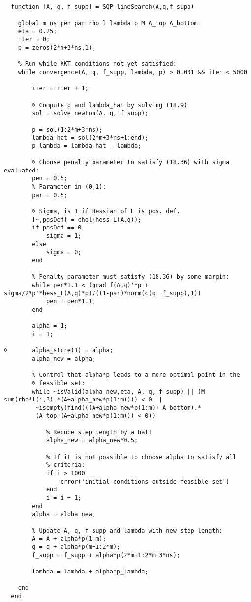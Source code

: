 \begin{lstlisting}

  function [A, q, f_supp] = SQP_lineSearch(A,q,f_supp)
  
    global m ns pen par rho l lambda p M A_top A_bottom
    eta = 0.25;
    iter = 0;
    p = zeros(2*m+3*ns,1);

    % Run while KKT-conditions not yet satisfied:
    while convergence(A, q, f_supp, lambda, p) > 0.001 && iter < 5000 
        
        iter = iter + 1;
        
        % Compute p and lambda_hat by solving (18.9)
        sol = solve_newton(A, q, f_supp);
        
        p = sol(1:2*m+3*ns);
        lambda_hat = sol(2*m+3*ns+1:end);
        p_lambda = lambda_hat - lambda;
        
        % Choose penalty parameter to satisfy (18.36) with sigma evaluated:
        pen = 0.5;
        % Parameter in (0,1):
        par = 0.5;

        % Sigma, is 1 if Hessian of L is pos. def.
        [~,posDef] = chol(hess_L(A,q));
        if posDef == 0
            sigma = 1;
        else
            sigma = 0;
        end

        % Penalty parameter must satisfy (18.36) by some margin:
        while pen*1.1 < (grad_f(A,q)'*p + sigma/2*p'*hess_L(A,q)*p)/((1-par)*norm(c(q, f_supp),1))
            pen = pen*1.1;
        end

        alpha = 1;
        i = 1;
            
%       alpha_store(1) = alpha;
        alpha_new = alpha;
        
        % Control that alpha*p leads to a more optimal point in the
        % feasible set:
        while ~isValid(alpha_new,eta, A, q, f_supp) || (M-sum(rho*l(:,3).*(A+alpha_new*p(1:m)))) < 0 || 
         ~isempty(find(((A+alpha_new*p(1:m))-A_bottom).*
         (A_top-(A+alpha_new*p(1:m))) < 0))

            % Reduce step length by a half
            alpha_new = alpha_new*0.5;
            
            % If it is not possible to choose alpha to satisfy all
            % criteria:
            if i > 1000
                error('initial conditions outside feasible set')
            end
            i = i + 1;
        end
        alpha = alpha_new;

        % Update A, q, f_supp and lambda with new step length:
        A = A + alpha*p(1:m);
        q = q + alpha*p(m+1:2*m);
        f_supp = f_supp + alpha*p(2*m+1:2*m+3*ns);

        lambda = lambda + alpha*p_lambda;   
            
    end
  end

\end{lstlisting}